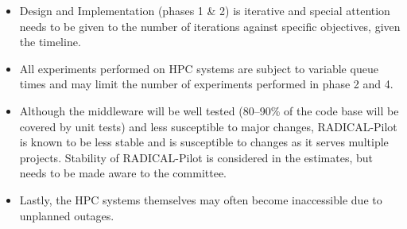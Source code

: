 \begin{itemize}
	\item Design and Implementation (phases 1 \& 2) is iterative and special attention 
	needs to be given to the number of iterations against specific objectives, 
	given the timeline.
  \item All experiments performed on HPC systems are subject to variable queue 
	times and may limit the number of experiments performed in phase 2 and 4.
	\item Although the middleware will be well tested (80--90\% of the code base 
	will be covered by unit tests) and less susceptible to major changes, RADICAL-Pilot 
	is known to be less stable and is susceptible to changes as it serves multiple 
	projects. Stability of RADICAL-Pilot is considered in the estimates, but needs 
	to be made aware to the committee.
	\item Lastly, the HPC systems themselves may often become inaccessible due to 
	unplanned outages.
\end{itemize}



\textit{}